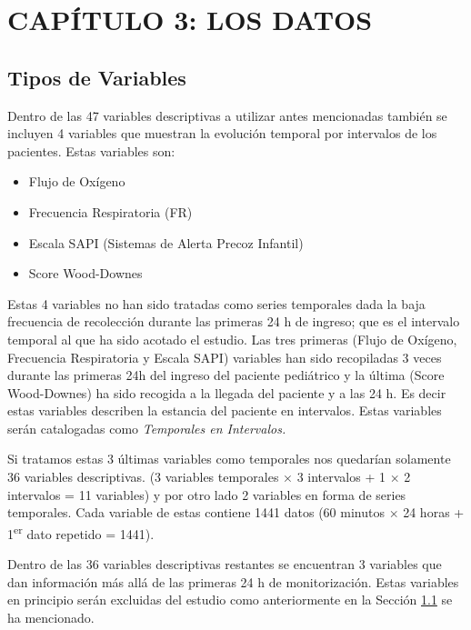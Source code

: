 \section{CAPÍTULO 3: LOS DATOS}\label{sec:los-datos}

\subsection{Tipos de Variables}\label{sec:tiposdevariables}

Dentro de las 47 variables descriptivas a utilizar antes mencionadas también se incluyen 4 variables que muestran la evolución temporal por intervalos de los pacientes. Estas variables son:

\begin{itemize}
    \item Flujo de Oxígeno
    \item Frecuencia Respiratoria (FR)
    \item Escala SAPI (Sistemas de Alerta Precoz Infantil)
    \item Score Wood-Downes
\end{itemize}

Estas 4 variables no han sido tratadas como series temporales dada la baja frecuencia de recolección durante las primeras 24 h de ingreso; que es el intervalo temporal al que ha sido acotado el estudio. Las tres primeras (Flujo de Oxígeno, Frecuencia Respiratoria y Escala SAPI) variables han sido recopiladas 3 veces durante las primeras 24h del ingreso del paciente pediátrico y la última (Score Wood-Downes) ha sido recogida a la llegada del paciente y a las 24 h. Es decir estas variables describen la estancia del paciente en intervalos.  Estas variables serán catalogadas como \textit{Temporales en Intervalos.} 

Si tratamos estas 3 últimas variables como temporales nos quedarían solamente 36 variables descriptivas. (3 variables temporales $\times$ 3 intervalos + 1 $\times$ 2 intervalos = 11 variables) y por otro lado 2 variables en forma de series temporales. Cada variable de estas contiene 1441 datos (60 minutos $\times$ 24 horas + 1\textsuperscript{er} dato repetido
= 1441).

Dentro de las 36 variables descriptivas restantes se encuentran 3 variables que dan información más allá de las primeras 24 h de monitorización. Estas variables en principio serán excluidas del estudio como anteriormente en la Sección \ref{sec:tiposdevariables} se ha mencionado. 

